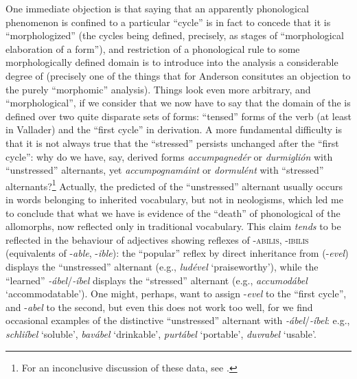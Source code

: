 \documentclass[output=paper,
modfonts
]{LSP/langsci}
\begin{document}
One immediate objection is that saying that an apparently phonological
phenomenon is confined to a particular ``cycle'' is in fact to concede
that it is ``morphologized'' (the cycles being defined, precisely, as
stages of ``morphological elaboration of a form''), and restriction of a
phonological rule to some morphologically defined domain is to introduce
into the analysis a considerable degree of  (precisely one
of the things that for Anderson consitutes an objection to the purely
``morphomic'' analysis). Things look even more arbitrary, and
``morphological'', if we consider that we now have to say that the domain
of the  is defined over two quite
disparate sets of forms: ``tensed'' forms of the verb (at least in
Vallader) and the ``first cycle'' in derivation. A more fundamental
difficulty is that it is not always true that the ``stressed'' 
persists unchanged after the ``first cycle'': why do we have, say, derived
forms \emph{accumpagnedér} or \emph{durmiglión} with ``unstressed''
alternants, yet \emph{accumpognamáint} or \emph{dormulént} with
``stressed'' alternants?\footnote{For an inconclusive discussion of these
  data, see \citet[171]{wolf2013a}.} Actually, the predicted  of the
``unstressed'' alternant usually occurs in words belonging to inherited
vocabulary, but not in neologisms, which led me to conclude \citep[41]{maiden2011a} that what we have is evidence of the ``death'' of phonological
 of the allomorphs, now reflected only in traditional
vocabulary. This claim \emph{tends} to be reflected in the behaviour of
adjectives showing reflexes of  -\textsc{abilis, -ibilis}
(equivalents of  -\emph{able}, -\emph{ible}): the ``popular''
reflex by direct inheritance from  (-\emph{evel}) displays the
``unstressed'' alternant (e.g., \emph{\emph{ludével}} `praiseworthy'),
while the ``learned'' ­\emph{-ábel}/\emph{-íbel} displays the ``stressed''
alternant (e.g., \emph{\emph{accumodábel}} `accommodatable'). One might,
perhaps, want to assign -\emph{evel} to the ``first cycle'', and
-\emph{abel} to the second, but even this does not work too well, for we
find occasional examples of the distinctive ``unstressed'' alternant with
\emph{-ábel}/\emph{-íbel}: e.g., \emph{schliíbel} `soluble',
\emph{bavábel} `drinkable', \emph{purtábel} `portable', \emph{duvrabel}
`usable'.
\end{document}
